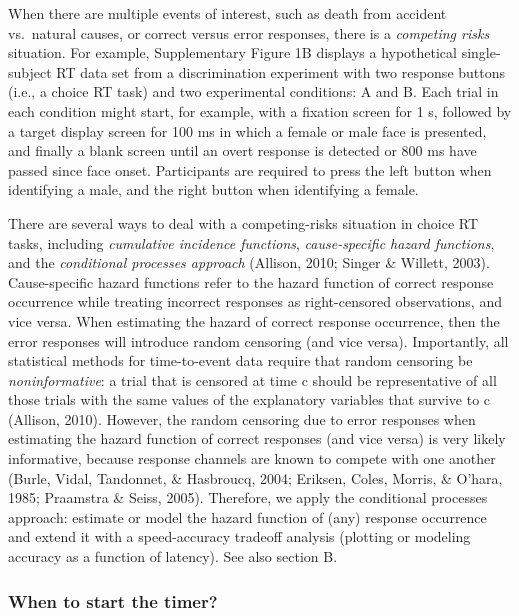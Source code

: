 \documentclass[
  english,
  man,floatsintext]{apa6}
\begin{document}
When there are multiple events of interest, such as death from accident vs.~natural causes, or correct versus error responses, there is a \emph{competing risks} situation. For example, Supplementary Figure 1B displays a hypothetical single-subject RT data set from a discrimination experiment with two response buttons (i.e., a choice RT task) and two experimental conditions: A and B. Each trial in each condition might start, for example, with a fixation screen for 1 s, followed by a target display screen for 100 ms in which a female or male face is presented, and finally a blank screen until an overt response is detected or 800 ms have passed since face onset. Participants are required to press the left button when identifying a male, and the right button when identifying a female.

There are several ways to deal with a competing-risks situation in choice RT tasks, including \emph{cumulative incidence functions}, \emph{cause-specific hazard functions}, and the \emph{conditional processes approach} (Allison, 2010; Singer \& Willett, 2003). Cause-specific hazard functions refer to the hazard function of correct response occurrence while treating incorrect responses as right-censored observations, and vice versa. When estimating the hazard of correct response occurrence, then the error responses will introduce random censoring (and vice versa). Importantly, all statistical methods for time-to-event data require that random censoring be \emph{noninformative}: a trial that is censored at time c should be representative of all those trials with the same values of the explanatory variables that survive to c (Allison, 2010). However, the random censoring due to error responses when estimating the hazard function of correct responses (and vice versa) is very likely informative, because response channels are known to compete with one another (Burle, Vidal, Tandonnet, \& Hasbroucq, 2004; Eriksen, Coles, Morris, \& O'hara, 1985; Praamstra \& Seiss, 2005). Therefore, we apply the conditional processes approach: estimate or model the hazard function of (any) response occurrence and extend it with a speed-accuracy tradeoff analysis (plotting or modeling accuracy as a function of latency). See also section B.

\subsubsection{When to start the timer?}\label{when-to-start-the-timer}
\end{document}
